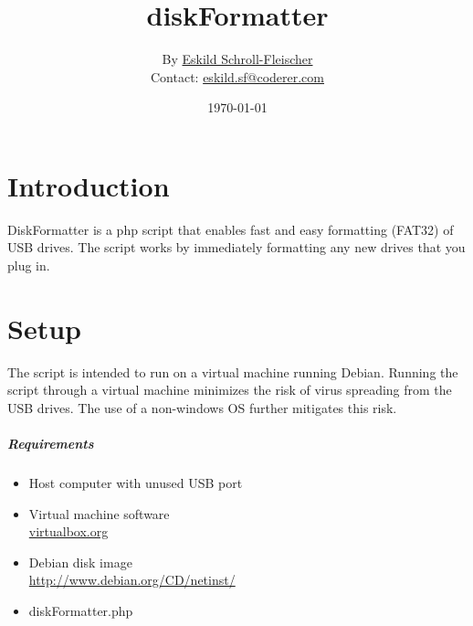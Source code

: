 \documentclass{article}
\begin{document}
\vspace{-5cm}
\author{By \href{mailto:eskild.sf@coderer.com}{Eskild Schroll-Fleischer}\\
Contact: \href{mailto:eskild.sf@coderer.com}{eskild.sf@coderer.com}}
\date{\today}
\title{diskFormatter}
\maketitle

\section{Introduction}
DiskFormatter is a php script that enables fast and easy formatting (FAT32) of USB drives.
The script works by immediately formatting any new drives that you plug in.

\section{Setup}
The script is intended to run on a virtual machine running Debian. Running the script through a virtual machine minimizes the risk of virus spreading from the USB drives. The use of a non-windows OS further mitigates this risk.

\subparagraph{Requirements}
\begin{itemize}
\item Host computer with unused USB port
\item Virtual machine software \\ \url{virtualbox.org}
\item Debian disk image \\ \url{http://www.debian.org/CD/netinst/}
\item diskFormatter.php
\end{itemize}
\end{document}
